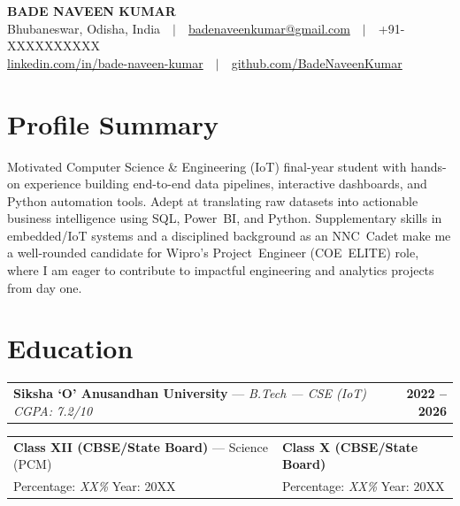 \documentclass[10pt,a4paper]{article}
\makeatletter
\newcommand{\entry}[4]{%
  \noindent
  \begin{tabularx}{\linewidth}{@{}X r@{}}
    \textbf{#1} — \textit{#2} & \textbf{#3}
  \end{tabularx}
  \vspace{1pt}#4\vspace{4pt}
}
\makeatother
\begin{document}
\begin{center}
  {\LARGE\bfseries BADE NAVEEN KUMAR}\\[3pt]
  Bhubaneswar, Odisha, India\ \ $\vert$\ \
  \href{mailto:badenaveenkumar@gmail.com}{badenaveenkumar@gmail.com}\ \ $\vert$\ \
  +91-XXXXXXXXXX\\[2pt]   %
  \href{https://linkedin.com/in/bade-naveen-kumar}{linkedin.com/in/bade-naveen-kumar}\ \ $\vert$\ \
  \href{https://github.com/BadeNaveenKumar}{github.com/BadeNaveenKumar}
\end{center}

\vspace{2pt}

\section{Profile Summary}
Motivated Computer Science \& Engineering (IoT) final-year student with hands-on experience building
end-to-end data pipelines, interactive dashboards, and Python automation tools.
Adept at translating raw datasets into actionable business intelligence using SQL, Power~BI, and Python.
Supplementary skills in embedded/IoT systems and a disciplined background as an NNC~Cadet make me a
well-rounded candidate for Wipro's Project~Engineer (COE~ELITE) role, where I am eager to contribute
to impactful engineering and analytics projects from day one.

\section{Education}
\entry{Siksha `O' Anusandhan University}{B.Tech — CSE (IoT) \quad CGPA: 7.2/10}{2022 -- 2026}{}

\vspace{-2pt}
\noindent
\begin{tabularx}{\linewidth}{@{}X X@{}}
  \textbf{Class XII (CBSE/State Board)} — Science (PCM) & \textbf{Class X (CBSE/State Board)} \\
  Percentage: \textit{XX\%} \hfill Year: 20XX & Percentage: \textit{XX\%} \hfill Year: 20XX
\end{tabularx}
\end{document}
